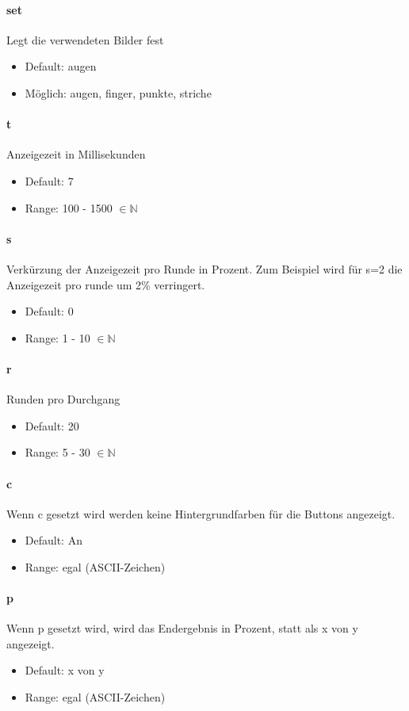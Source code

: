\documentclass[]{article}
\begin{document}
\begin{multicols}{2}

	\paragraph{set}  Legt die verwendeten Bilder fest
	\begin{itemize}
		\item Default: augen
		\item Möglich: augen, finger, punkte, striche
	\end{itemize}

	\paragraph{t} Anzeigezeit in Millisekunden

	\begin{itemize}
		\item Default: 7
		\item Range: 100 - 1500 $\in \mathbb{N}$
	\end{itemize}

	\paragraph{s} Verkürzung der Anzeigezeit pro Runde in Prozent. Zum Beispiel wird für s=2 die Anzeigezeit pro runde um 2\% verringert.
	\begin{itemize}
		\item Default: 0
		\item Range: 1 - 10 $\in \mathbb{N}$
	\end{itemize}

	\paragraph{r}  Runden pro Durchgang
	\begin{itemize}
		\item Default: 20
		\item Range: 5 - 30 $\in \mathbb{N}$
	\end{itemize}

	\paragraph{c}  Wenn c gesetzt wird werden keine Hintergrundfarben für die Buttons angezeigt.
	\begin{itemize}
		\item Default: An
		\item Range: egal (ASCII-Zeichen)
	\end{itemize}

	\paragraph{p}  Wenn p gesetzt wird, wird das Endergebnis in Prozent, statt als x von y angezeigt.
	\begin{itemize}
		\item Default: x von y
		\item Range: egal (ASCII-Zeichen)
	\end{itemize}

	\end{multicols}
\end{document}
